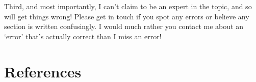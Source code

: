\documentclass[a4paper,11pt]{report}
\begin{document}
\begin{sloppypar}
Third, and most importantly, I can't claim to be an expert in the topic, and so will get things wrong! Please get in touch if you spot any errors or believe any section is written confusingly. I would much rather you contact me about an `error' that's actually correct than I miss an error!













\chapter*{References}

\printbibliography[heading=none]

\end{sloppypar}
\end{document}
